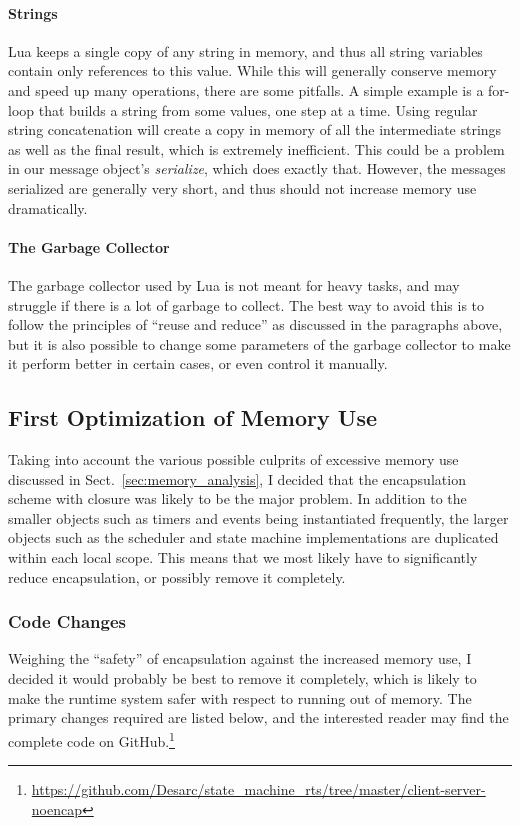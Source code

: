 \paragraph{Strings} Lua keeps a single copy of any string in memory, and thus all string variables contain only references to this value. While this will generally conserve memory and speed up many operations, there are some pitfalls. A simple example is a for-loop that builds a string from some values, one step at a time. Using regular string concatenation will create a copy in memory of all the intermediate strings as well as the final result, which is extremely inefficient. This could be a problem in our message object's \emph{serialize}, which does exactly that. However, the messages serialized are generally very short, and thus should not increase memory use dramatically.

\paragraph{The Garbage Collector} 
The garbage collector used by Lua is not meant for heavy tasks, and may struggle if there is a lot of garbage to collect. The best way to avoid this is to follow the principles of ``reuse and reduce'' as discussed in the paragraphs above, but it is also possible to change some parameters of the garbage collector to make it perform better in certain cases, or even control it manually.

\subsection{First Optimization of Memory Use}
\label{sec:first_optimalization}
Taking into account the various possible culprits of excessive memory use discussed in Sect.~\ref{sec:memory_analysis}, I decided that the encapsulation scheme with closure was likely to be the major problem. In addition to the smaller objects such as timers and events being instantiated frequently, the larger objects such as the scheduler and state machine implementations are duplicated within each local scope. This means that we most likely have to significantly reduce encapsulation, or possibly remove it completely.

\subsubsection{Code Changes}
Weighing the ``safety'' of encapsulation against the increased memory use, I decided it would probably be best to remove it completely, which is likely to make the runtime system safer with respect to running out of memory. The primary changes required are listed below, and the interested reader may find the complete code on GitHub.\footnote{\url{https://github.com/Desarc/state_machine_rts/tree/master/client-server-noencap}}


